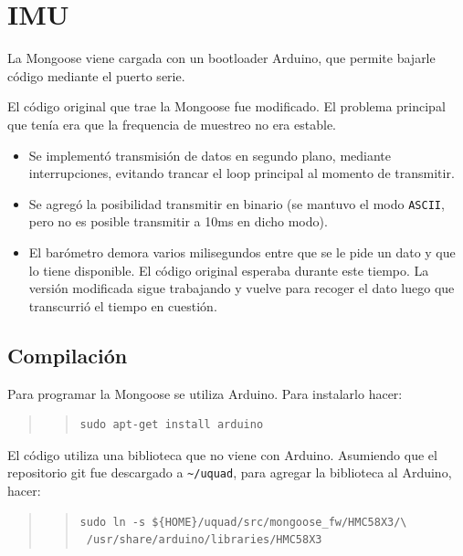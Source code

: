 \documentclass[main]{subfiles}
\begin{document}
\section{IMU}
\label{sec:codigo:imu}

La Mongoose viene cargada con un bootloader Arduino, que permite bajarle código mediante el puerto serie.

El código original que trae la Mongoose fue modificado. El problema principal que tenía era que la frequencia de muestreo no era estable.
\begin{itemize}
\item Se implementó transmisión de datos en segundo plano, mediante interrupciones, evitando trancar el loop principal al momento de transmitir.
\item Se agregó la posibilidad transmitir en binario (se mantuvo el modo \verb+ASCII+, pero no es posible transmitir a 10ms en dicho modo).
\item El barómetro demora varios milisegundos entre que se le pide un dato y que lo tiene disponible. El código original esperaba durante este tiempo. La versión modificada sigue trabajando y vuelve para recoger el dato luego que transcurrió el tiempo en cuestión.
\end{itemize}

\subsection{Compilación}
\label{sec:codigo:compilacion-mongoose}

Para programar la Mongoose se utiliza Arduino. Para instalarlo hacer:
\begin{quote}
\begin{quote}
\begin{verbatim}
sudo apt-get install arduino
\end{verbatim}
\end{quote}
\end{quote}

El código utiliza una biblioteca que no viene con Arduino. Asumiendo que el repositorio git fue descargado a \verb+~/uquad+, para agregar la biblioteca al Arduino, hacer:
\begin{quote}
\begin{quote}
\begin{verbatim}
sudo ln -s ${HOME}/uquad/src/mongoose_fw/HMC58X3/\
 /usr/share/arduino/libraries/HMC58X3
\end{verbatim}
\end{quote}
\end{quote}
\end{document}
